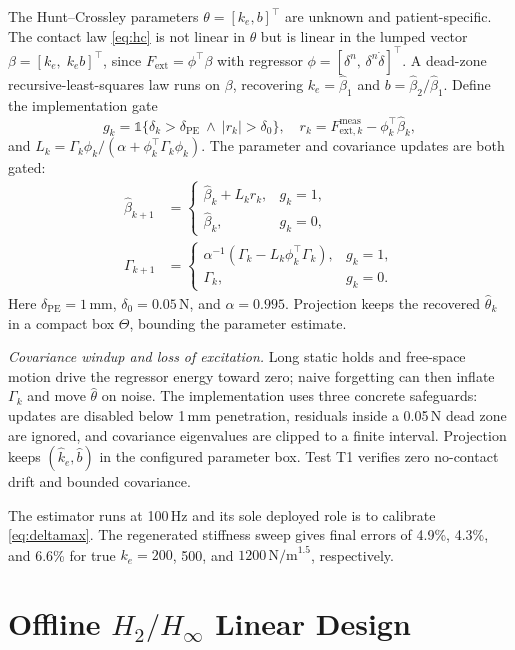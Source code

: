 The Hunt--Crossley parameters $\theta = [k_e, b]^\top$ are unknown and patient-specific. The contact law \eqref{eq:hc} is not linear in $\theta$ but is linear in the lumped vector $\beta = [k_e,\; k_e b]^\top$, since $F_{\text{ext}} = \phi^\top\beta$ with regressor $\phi = [\delta^n,\, \delta^n\dot\delta]^\top$. A dead-zone recursive-least-squares law runs on $\beta$, recovering $k_e=\hat\beta_1$ and $b=\hat\beta_2/\hat\beta_1$. Define the implementation gate
\begin{equation}
g_k=\mathbb{1}\{\delta_k>\delta_{\mathrm{PE}}\ \land\ |r_k|>\delta_0\},
\quad
r_k=F_{\text{ext},k}^{\text{meas}}-\phi_k^\top\hat\beta_k,
\end{equation}
and $L_k=\Gamma_k\phi_k/(\alpha+\phi_k^\top\Gamma_k\phi_k)$. The parameter and covariance updates are both gated:
\begin{align}
\hat\beta_{k+1}&=
\begin{cases}
\hat\beta_k+L_kr_k,&g_k=1,\\
\hat\beta_k,&g_k=0,
\end{cases}
\label{eq:rls}\\
\Gamma_{k+1}&=
\begin{cases}
\alpha^{-1}(\Gamma_k-L_k\phi_k^\top\Gamma_k),&g_k=1,\\
\Gamma_k,&g_k=0.
\end{cases}
\label{eq:rls_cov}
\end{align}
Here $\delta_{\mathrm{PE}}=1$\,mm, $\delta_0=0.05$\,N, and $\alpha=0.995$. Projection keeps the recovered $\hat\theta_k$ in a compact box $\Theta$, bounding the parameter estimate.

\emph{Covariance windup and loss of excitation.} Long static holds and free-space motion drive the regressor energy toward zero; naive forgetting can then inflate $\Gamma_k$ and move $\hat\theta$ on noise. The implementation uses three concrete safeguards: updates are disabled below 1\,mm penetration, residuals inside a 0.05\,N dead zone are ignored, and covariance eigenvalues are clipped to a finite interval. Projection keeps $(\hat k_e,\hat b)$ in the configured parameter box. Test T1 verifies zero no-contact drift and bounded covariance.

The estimator runs at 100\,Hz and its sole deployed role is to calibrate \eqref{eq:deltamax}. The regenerated stiffness sweep gives final errors of 4.9\%, 4.3\%, and 6.6\% for true $k_e=200$, 500, and $1200\,\mathrm{N/m}^{1.5}$, respectively.

\section{Offline $H_2/H_\infty$ Linear Design}\label{sec:hinf}

